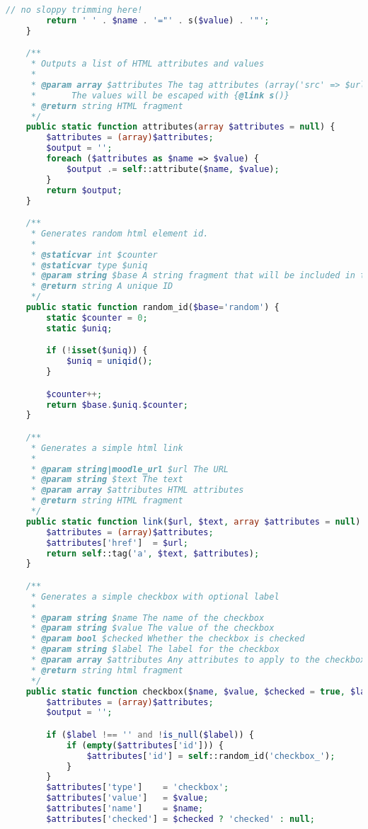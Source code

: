 \begin{lstlisting}[language=PHP]
        // no sloppy trimming here!
        return ' ' . $name . '="' . s($value) . '"';
    }

    /**
     * Outputs a list of HTML attributes and values
     *
     * @param array $attributes The tag attributes (array('src' => $url, 'class' => 'class1') etc.)
     *       The values will be escaped with {@link s()}
     * @return string HTML fragment
     */
    public static function attributes(array $attributes = null) {
        $attributes = (array)$attributes;
        $output = '';
        foreach ($attributes as $name => $value) {
            $output .= self::attribute($name, $value);
        }
        return $output;
    }

    /**
     * Generates random html element id.
     *
     * @staticvar int $counter
     * @staticvar type $uniq
     * @param string $base A string fragment that will be included in the random ID.
     * @return string A unique ID
     */
    public static function random_id($base='random') {
        static $counter = 0;
        static $uniq;

        if (!isset($uniq)) {
            $uniq = uniqid();
        }

        $counter++;
        return $base.$uniq.$counter;
    }

    /**
     * Generates a simple html link
     *
     * @param string|moodle_url $url The URL
     * @param string $text The text
     * @param array $attributes HTML attributes
     * @return string HTML fragment
     */
    public static function link($url, $text, array $attributes = null) {
        $attributes = (array)$attributes;
        $attributes['href']  = $url;
        return self::tag('a', $text, $attributes);
    }

    /**
     * Generates a simple checkbox with optional label
     *
     * @param string $name The name of the checkbox
     * @param string $value The value of the checkbox
     * @param bool $checked Whether the checkbox is checked
     * @param string $label The label for the checkbox
     * @param array $attributes Any attributes to apply to the checkbox
     * @return string html fragment
     */
    public static function checkbox($name, $value, $checked = true, $label = '', array $attributes = null) {
        $attributes = (array)$attributes;
        $output = '';

        if ($label !== '' and !is_null($label)) {
            if (empty($attributes['id'])) {
                $attributes['id'] = self::random_id('checkbox_');
            }
        }
        $attributes['type']    = 'checkbox';
        $attributes['value']   = $value;
        $attributes['name']    = $name;
        $attributes['checked'] = $checked ? 'checked' : null;


\end{lstlisting}
